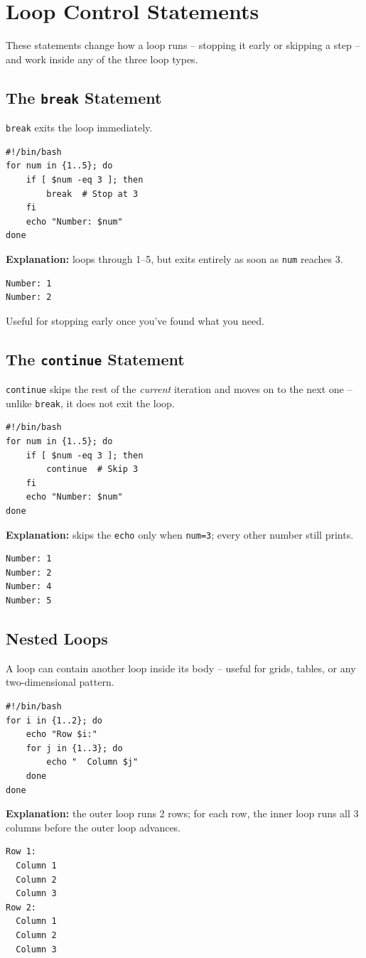 \section{Loop Control Statements}
These statements change how a loop runs -- stopping it early or skipping a step -- and work inside any of the three loop types.

\subsection{The \texttt{break} Statement}
\texttt{break} exits the loop immediately.
\begin{lstlisting}[language=Terminal]
#!/bin/bash
for num in {1..5}; do
    if [ $num -eq 3 ]; then
        break  # Stop at 3
    fi
    echo "Number: $num"
done
\end{lstlisting}
\textbf{Explanation:} loops through 1--5, but exits entirely as soon as \texttt{num} reaches 3.
\begin{lstlisting}[language=Terminal]
Number: 1
Number: 2
\end{lstlisting}
Useful for stopping early once you've found what you need.

\subsection{The \texttt{continue} Statement}
\texttt{continue} skips the rest of the \emph{current} iteration and moves on to the next one -- unlike \texttt{break}, it does not exit the loop.
\begin{lstlisting}[language=Terminal]
#!/bin/bash
for num in {1..5}; do
    if [ $num -eq 3 ]; then
        continue  # Skip 3
    fi
    echo "Number: $num"
done
\end{lstlisting}
\textbf{Explanation:} skips the \texttt{echo} only when \texttt{num=3}; every other number still prints.
\begin{lstlisting}[language=Terminal]
Number: 1
Number: 2
Number: 4
Number: 5
\end{lstlisting}

\subsection{Nested Loops}
A loop can contain another loop inside its body -- useful for grids, tables, or any two-dimensional pattern.
\begin{lstlisting}[language=Terminal]
#!/bin/bash
for i in {1..2}; do
    echo "Row $i:"
    for j in {1..3}; do
        echo "  Column $j"
    done
done
\end{lstlisting}
\textbf{Explanation:} the outer loop runs 2 rows; for each row, the inner loop runs all 3 columns before the outer loop advances.
\begin{lstlisting}[language=Terminal]
Row 1:
  Column 1
  Column 2
  Column 3
Row 2:
  Column 1
  Column 2
  Column 3
\end{lstlisting}

